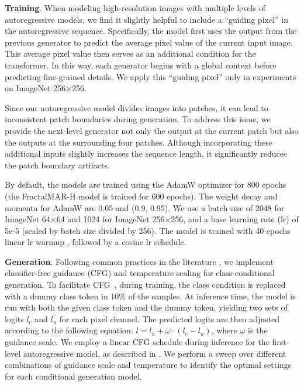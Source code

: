 \documentclass{article}
\renewcommand{\paragraph}[1]{\vspace{0.0em}\noindent\textbf{#1}}
\begin{document}
\paragraph{Training}. When modeling high-resolution images with multiple levels of autoregressive models, we find it slightly helpful to include a ``guiding pixel'' in the autoregressive sequence. Specifically, the model first uses the output from the previous generator to predict the average pixel value of the current input image. This average pixel value then serves as an additional condition for the transformer. In this way, each generator begins with a global context before predicting fine-grained details. We apply this ``guiding pixel'' only in experiments on ImageNet 256$\times$256.

Since our autoregressive model divides images into patches, it can lead to inconsistent patch boundaries during generation. To address this issue, we provide the next-level generator not only the output at the current patch but also the outputs at the surrounding four patches. Although incorporating these additional inputs slightly increases the sequence length, it significantly reduces the patch boundary artifacts.

By default, the models are trained using the AdamW optimizer \citep{Loshchilov2019} for 800 epochs (the FractalMAR-H model is trained for 600 epochs).
The weight decay and momenta for AdamW are 0.05 and (0.9, 0.95).
We use a batch size of 2048 for ImageNet 64$\times$64 and 1024 for ImageNet 256$\times$256, and a base learning rate (lr) of 5e-5 (scaled by batch size divided by 256).
The model is trained with 40 epochs linear lr warmup \citep{Goyal2017}, followed by a cosine lr schedule.

\paragraph{Generation}. Following common practices in the literature \citep{Chang2022, Chang2023, Li2023}, we implement classifier-free guidance (CFG) and temperature scaling for class-conditional generation. To facilitate CFG~\citep{ho2022classifier}, during training, the class condition is replaced with a dummy class token in 10\% of the samples.
At inference time, the model is run with both the given class token and the dummy token, yielding two sets of logits $l_c$ and $l_u$ for each pixel channel. The predicted logits are then adjusted according to the following equation: $l = l_u + \omega\cdot(l_c - l_u)$, where $\omega$ is the guidance scale. We employ a linear CFG schedule during inference for the first-level autoregressive model, as described in \cite{Chang2023}. We perform a sweep over different combinations of guidance scale and temperature to identify the optimal settings for each conditional generation model.
\end{document}
